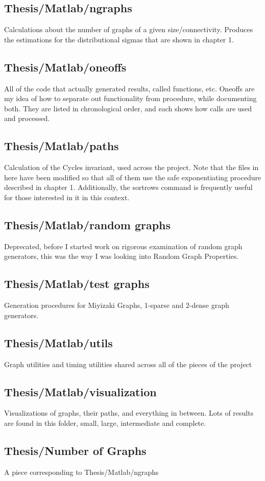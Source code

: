 \subsection*{Thesis/Matlab/ngraphs}

Calculations about the number of graphs of a given size/connectivity.
Produces the estimations for the distributional sigmas that are shown in chapter 1.

\subsection*{Thesis/Matlab/oneoffs}

All of the code that actually generated results, called functions, etc.
Oneoffs are my idea of how to separate out functionality from procedure, while documenting both.
They are listed in chronological order, and each shows how calls are used and processed.

\subsection*{Thesis/Matlab/paths}

Calculation of the Cycles invariant, used across the project.
Note that the files in here have been modified so that all of them use the safe exponentiating procedure described in chapter 1.
Additionally, the sortrows command is frequently useful for those interested in it in this context.

\subsection*{Thesis/Matlab/random graphs}
Deprecated, before I started work on rigorous examination of random graph generators, this was the way I was looking into Random Graph Properties.

\subsection*{Thesis/Matlab/test graphs}

Generation procedures for Miyizaki Graphs, 1-sparse and 2-dense graph generators.

\subsection*{Thesis/Matlab/utils}

Graph utilities and timing utilities shared across all of the pieces of the project

\subsection*{Thesis/Matlab/visualization}

Visualizations of graphs, their paths, and everything in between. 
Lots of results are found in this folder, small, large, intermediate and complete.

\subsection{Thesis/Number of Graphs}

A piece corresponding to Thesis/Matlab/ngraphs
